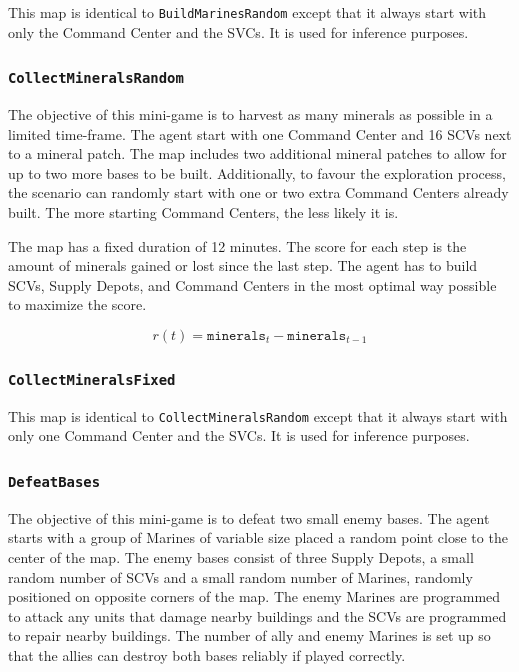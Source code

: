 This map is identical to \texttt{BuildMarinesRandom} except that it always start with only the Command Center and the SVCs. It is used for inference purposes.

\subsubsection*{\texttt{CollectMineralsRandom}}

The objective of this mini-game is to harvest as many minerals as possible in a limited time-frame. The agent start with one Command Center and 16 SCVs next to a mineral patch. The map includes two additional mineral patches to allow for up to two more bases to be built. Additionally, to favour the exploration process, the scenario can randomly start with one or two extra Command Centers already built. The more starting Command Centers, the less likely it is.

The map has a fixed duration of 12 minutes. The score for each step is the amount of minerals gained or lost since the last step. The agent has to build SCVs, Supply Depots, and Command Centers in the most optimal way possible to maximize the score.

$$
r(t) = \texttt{minerals}_{t} - \texttt{minerals}_{t-1}
$$

\subsubsection*{\texttt{CollectMineralsFixed}}

This map is identical to \texttt{CollectMineralsRandom} except that it always start with only one Command Center and the SVCs. It is used for inference purposes.

\subsubsection*{\texttt{DefeatBases}}

The objective of this mini-game is to defeat two small enemy bases. The agent starts with a group of Marines of variable size placed a random point close to the center of the map. The enemy bases consist of three Supply Depots, a small random number of SCVs and a small random number of Marines, randomly positioned on opposite corners of the map. The enemy Marines are programmed to attack any units that damage nearby buildings and the SCVs are programmed to repair nearby buildings. The number of ally and enemy Marines is set up so that the allies can destroy both bases reliably if played correctly.

